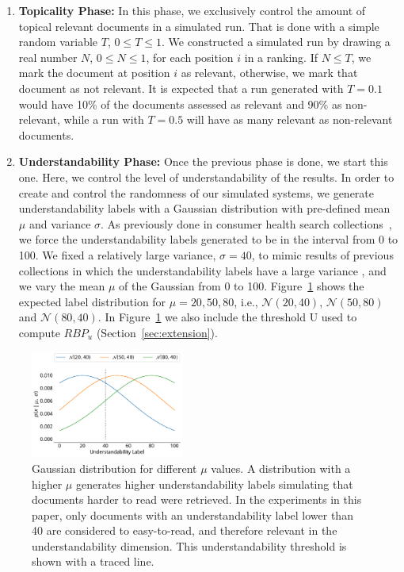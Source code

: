 \begin{enumerate}
\item \textbf{Topicality Phase:} In this phase, we exclusively control the amount of topical relevant documents in a simulated run. That is done with a simple random variable $T$, $0 \le T \le 1$. 
We constructed a simulated run by drawing a real number $N$, $0 \le N \le 1$, for each position $i$ in a ranking. If $N \le T$, we mark the document at position $i$ as relevant, otherwise, we mark that document as not relevant. It is expected that a run generated with $T=0.1$ would have 10\% of the documents assessed as relevant and 90\% as non-relevant, while a run with $T=0.5$ will have as many relevant as non-relevant documents. 

\item \textbf{Understandability Phase:}  Once the previous phase is done, we start this one. Here, we control the level of understandability of the results. In order to create and control the randomness of our simulated systems, we generate understandability labels with a Gaussian distribution with pre-defined mean $\mu$ and variance $\sigma$. 
As previously done in consumer health search collections~\cite{clefIR16,clefIR17}, we force the understandability labels generated to be in the interval from 0 to 100. 
We fixed a relatively large variance, $\sigma=40$, to mimic results of previous collections in which the understandability labels have a large variance \cite{clefIR16}, and we vary the mean $\mu$ of the Gaussian from 0 to 100. Figure~\ref{fig:gaussians} shows the expected label distribution for $\mu=20, 50, 80$, i.e., $\mathcal{N}(20, 40)$, $\mathcal{N}(50, 80)$ and $\mathcal{N}(80, 40)$.
In Figure~\ref{fig:gaussians} we also include the threshold U used to compute $RBP_u$ (Section~\ref{sec:extension}).

\end{enumerate}

\begin{figure}[t!]
  \centering
   \includegraphics[width=0.45\textwidth]{figs/gaussians}
    \caption{Gaussian distribution for different $\mu$ values. A distribution with a higher $\mu$ generates higher understandability labels simulating that documents harder to read were retrieved. In the experiments in this paper, only documents with an understandability label lower than 40 are considered to easy-to-read, and therefore relevant in the understandability dimension. This understandability threshold is shown with a traced line.}
  \label{fig:gaussians}
\end{figure}

